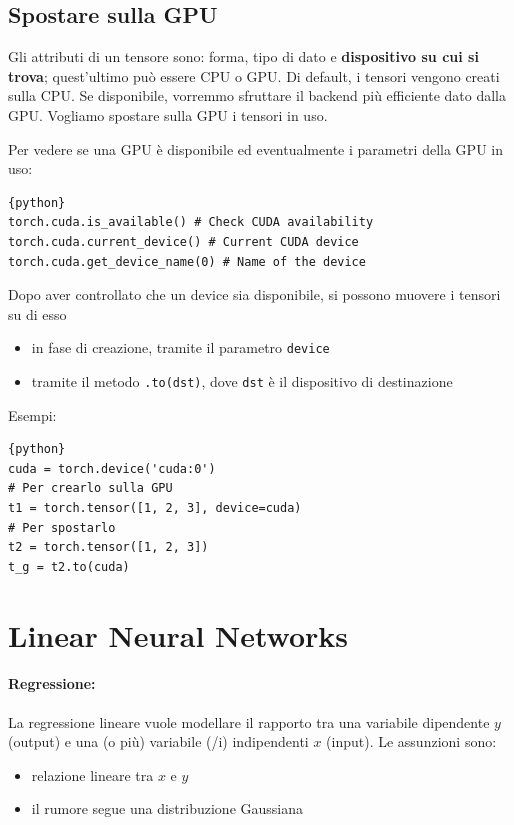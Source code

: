 \subsection{Spostare sulla GPU}

Gli attributi di un tensore sono: forma, tipo di dato e \textbf{dispositivo su cui si trova}; quest'ultimo può essere CPU o GPU. Di default, i tensori vengono creati sulla CPU. Se disponibile, vorremmo sfruttare il backend più efficiente dato dalla GPU. Vogliamo spostare sulla GPU i tensori in uso.

Per vedere se una GPU è disponibile ed eventualmente i parametri della GPU in uso:
\begin{lstlisting}{python}
torch.cuda.is_available() # Check CUDA availability
torch.cuda.current_device() # Current CUDA device
torch.cuda.get_device_name(0) # Name of the device
\end{lstlisting}

Dopo aver controllato che un device sia disponibile, si possono muovere i tensori su di esso
\begin{itemize}
    \item in fase di creazione, tramite il parametro \texttt{device}
    
    \item tramite il metodo \texttt{.to(dst)}, dove \texttt{dst} è il dispositivo di destinazione
\end{itemize}

Esempi:
\begin{lstlisting}{python}
cuda = torch.device('cuda:0')
# Per crearlo sulla GPU
t1 = torch.tensor([1, 2, 3], device=cuda)
# Per spostarlo
t2 = torch.tensor([1, 2, 3])
t_g = t2.to(cuda)
\end{lstlisting}

\section{Linear Neural Networks}

\paragraph{Regressione:} La regressione lineare vuole modellare il rapporto tra una variabile dipendente $y$ (output) e una (o più) variabile (/i) indipendenti $x$ (input). Le assunzioni sono: 
\begin{itemize}
    \item relazione lineare tra $x$ e $y$
    
    \item il rumore segue una distribuzione Gaussiana
\end{itemize}

